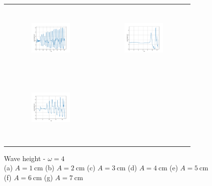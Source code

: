 \begin{figure}[H]
\begin{center}
\begin{tabular}{cc}
\includegraphics[width=0.45\textwidth, height=3.5cm]{graph/omega=1.00_A=5_wave.pdf}
&
\includegraphics[width=0.45\textwidth, height=3.5cm]{graph/omega=1.00_A=6_wave.pdf}\\
\includegraphics[width=0.45\textwidth, height=3.5cm]{graph/omega=1.00_A=7_wave.pdf}
&
\\
&
\\
\end{tabular}
\end{center}
\caption{Wave height - $\omega=4$ \\ (a) $A=1\mathrm{~cm}$ (b) $A=2\mathrm{~cm}$ (c) $A=3\mathrm{~cm}$ (d) $A=4\mathrm{~cm}$ (e) $A=5\mathrm{~cm}$\\ (f) $A=6\mathrm{~cm}$ (g) $A=7\mathrm{~cm}$}
\label{Data_omega=4_wave}
\end{figure}

